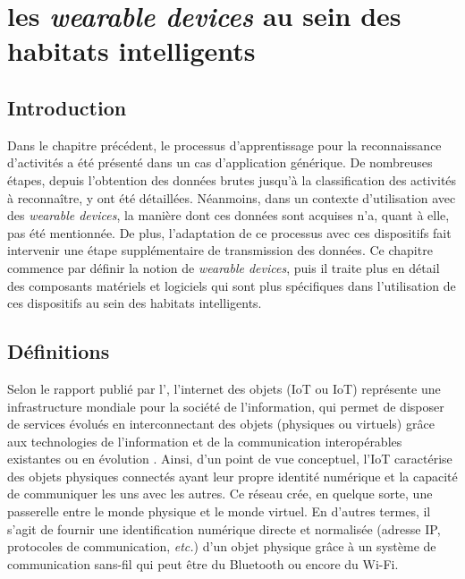 \chapter{les \textit{wearable devices} au sein des habitats intelligents}
\label{chap:3}

\section{Introduction}

Dans le chapitre précédent, le processus d'apprentissage pour la reconnaissance d'activités a été présenté dans un cas d'application générique. De nombreuses étapes, depuis l'obtention des données brutes jusqu'à la classification des activités à reconnaître, y ont été détaillées. Néanmoins, dans un contexte d'utilisation avec des \textit{wearable devices}, la manière dont ces données sont acquises n'a, quant à elle, pas été mentionnée. De plus, l'adaptation de ce processus avec ces dispositifs fait intervenir une étape supplémentaire de transmission des données. Ce chapitre commence par définir la notion de \textit{wearable devices}, puis il traite plus en détail des composants matériels et logiciels qui sont plus spécifiques dans l'utilisation de ces dispositifs au sein des habitats intelligents.

\section{Définitions}

Selon le rapport publié par l'\cite{InternationalTelecommunicationUnion2012}, l'internet des objets (\acl{IoT} ou \acs{IoT}) représente une \og infrastructure mondiale pour la société de l'information, qui permet de disposer de services évolués en interconnectant des objets (physiques ou virtuels) grâce aux technologies de l'information et de la communication interopérables existantes ou en évolution \fg. Ainsi, d'un point de vue conceptuel, l'\acs{IoT} caractérise des objets physiques connectés ayant leur propre identité numérique et la capacité de communiquer les uns avec les autres. Ce réseau crée, en quelque sorte, une passerelle entre le monde physique et le monde virtuel. En d'autres termes, il s'agit de fournir une identification numérique directe et normalisée (adresse IP, protocoles de communication, \textit{etc.}) d'un objet physique grâce à un système de communication sans-fil qui peut être du Bluetooth ou encore du Wi-Fi.

